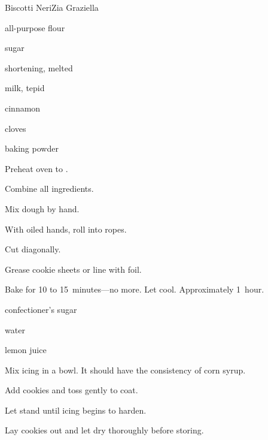 \begin{recipe}{Biscotti Neri}{Zia Graziella}{}

\begin{ingredients}
\item {} all-purpose flour
\item {} sugar
\item \lbs{\half} shortening, melted
\item {} milk, tepid 
\item {} 
\item {} cinnamon
\item {} cloves
\item {} baking powder
\end{ingredients}

\begin{directions}
\item Preheat oven to .
\item Combine all ingredients.
\item Mix dough by hand.
\item With oiled hands, roll into ropes.
\item Cut diagonally.
\item Grease cookie sheets or line with foil.
\item Bake for 10 to 15~minutes---no more.
\itme Let cool. Approximately 1~hour.
\end{directions}


\begin{ingredients}
\item confectioner's sugar
\item water
\item lemon juice
\end{ingredients}

\begin{directions}
\item Mix icing in a bowl. It should have the consistency of corn syrup.
\item Add cookies and toss gently to coat.
\item Let stand until icing begins to harden.
\item Lay cookies out and let dry thoroughly before storing.
\end{directions}

\end{recipe}
